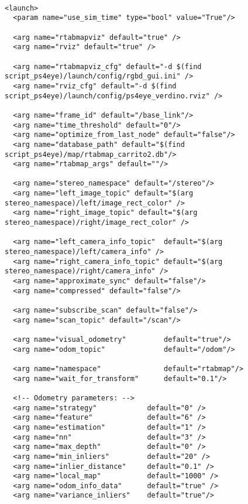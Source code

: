 \begin{center}
\begin{footnotesize}
\begin{verbatim}

<launch>
  <param name="use_sim_time" type="bool" value="True"/>
 
  <arg name="rtabmapviz" default="true" />
  <arg name="rviz" default="true" />
  
  <arg name="rtabmapviz_cfg" default="-d $(find script_ps4eye)/launch/config/rgbd_gui.ini" />
  <arg name="rviz_cfg" default="-d $(find script_ps4eye)/launch/config/ps4eye_verdino.rviz" />
  
  <arg name="frame_id" default="/base_link"/>
  <arg name="time_threshold" default="0"/>
  <arg name="optimize_from_last_node" default="false"/>
  <arg name="database_path" default="$(find script_ps4eye)/map/rtabmap_carrito2.db"/>
  <arg name="rtabmap_args" default=""/>

  <arg name="stereo_namespace" default="/stereo"/>
  <arg name="left_image_topic" default="$(arg stereo_namespace)/left/image_rect_color" />
  <arg name="right_image_topic" default="$(arg stereo_namespace)/right/image_rect_color" />

  <arg name="left_camera_info_topic"  default="$(arg stereo_namespace)/left/camera_info" />
  <arg name="right_camera_info_topic" default="$(arg stereo_namespace)/right/camera_info" />
  <arg name="approximate_sync" default="false"/>
  <arg name="compressed" default="false"/>
   
  <arg name="subscribe_scan" default="false"/>
  <arg name="scan_topic" default="/scan"/>
   
  <arg name="visual_odometry"         default="true"/>
  <arg name="odom_topic"              default="/odom"/>
  
  <arg name="namespace"               default="rtabmap"/>
  <arg name="wait_for_transform"      default="0.1"/>
  
  <!-- Odometry parameters: -->
  <arg name="strategy"            default="0" />
  <arg name="feature"             default="6" />
  <arg name="estimation"          default="1" />
  <arg name="nn"                  default="3" /> 
  <arg name="max_depth"           default="0" />
  <arg name="min_inliers"         default="20" />
  <arg name="inlier_distance"     default="0.1" />
  <arg name="local_map"           default="1000" /> 
  <arg name="odom_info_data"      default="true" />
  <arg name="variance_inliers"    default="true"/>
        

\end{verbatim}
\end{footnotesize}
\end{center}
